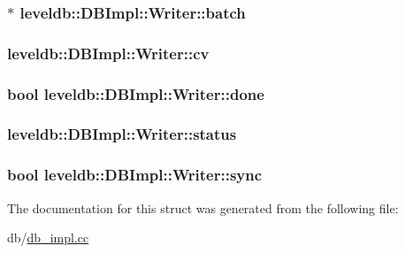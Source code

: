 \subsubsection[{batch}]{$\ast$ leveldb\+::\+D\+B\+Impl\+::\+Writer\+::batch}\label{structleveldb_1_1_d_b_impl_1_1_writer_ada051134318411635892f0a7d17cb7c0}
\hypertarget{structleveldb_1_1_d_b_impl_1_1_writer_aacb835eedc44855a7c223fca024c5ac4}{}
\subsubsection[{cv}]{ leveldb\+::\+D\+B\+Impl\+::\+Writer\+::cv}\label{structleveldb_1_1_d_b_impl_1_1_writer_aacb835eedc44855a7c223fca024c5ac4}
\hypertarget{structleveldb_1_1_d_b_impl_1_1_writer_afc6025afd873f82252cb563687bd3106}{}
\subsubsection[{done}]{\setlength{\rightskip}{0pt plus 5cm}bool leveldb\+::\+D\+B\+Impl\+::\+Writer\+::done}\label{structleveldb_1_1_d_b_impl_1_1_writer_afc6025afd873f82252cb563687bd3106}
\hypertarget{structleveldb_1_1_d_b_impl_1_1_writer_af3b0436a99d2679c0e0ac9f6e1fefa37}{}
\subsubsection[{status}]{ leveldb\+::\+D\+B\+Impl\+::\+Writer\+::status}\label{structleveldb_1_1_d_b_impl_1_1_writer_af3b0436a99d2679c0e0ac9f6e1fefa37}
\hypertarget{structleveldb_1_1_d_b_impl_1_1_writer_acb39717e1fa61127f262b474e18ec9f6}{}
\subsubsection[{sync}]{\setlength{\rightskip}{0pt plus 5cm}bool leveldb\+::\+D\+B\+Impl\+::\+Writer\+::sync}\label{structleveldb_1_1_d_b_impl_1_1_writer_acb39717e1fa61127f262b474e18ec9f6}


The documentation for this struct was generated from the following file\+:\begin{DoxyCompactItemize}
\item 
db/\hyperlink{db__impl_8cc}{db\+\_\+impl.\+cc}\end{DoxyCompactItemize}
